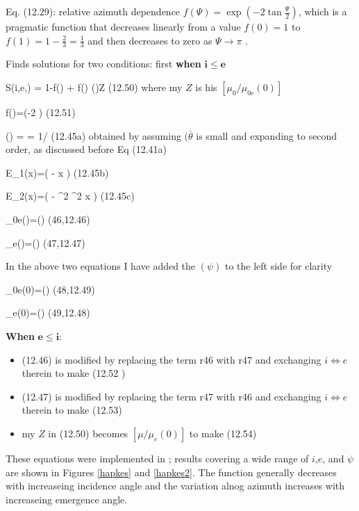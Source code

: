 \documentclass{article}
\begin{document}
 Eq. (12.29): relative azimuth dependence $f(\Psi)=\exp
  \left( -2 \tan \frac{\Psi}{2} \right)$, which is a pragmatic function that
  \bq decreases linearly from a value $f(0)=1$ to
  $f(1)=1-\frac{2}{3}=\frac{1}{3}$ and then decreases to zero as $\Psi
  \rightarrow \pi$ \eq.

  Finds solutions for two conditions: first \textbf{when} $\mathbf{i \leq e}$

 \qb S(i,e,\psi) =   
\frac{\chi(\overline{\theta})} {1-f(\psi) + f(\psi) \chi(\overline{\theta})Z} \qeq (12.50) \qe
 where my $Z$ is his $[ \mu_0 / \mu_{0e}(0)] $

\qb f(\psi)=\exp (-2 \tan {}) \qeq (12.51) \qe

\qb \chi(\overline{\theta}) = \langle \cos \vartheta \rangle = 1/ \qeq (12.45a) \qe obtained by assuming $(\overline{\theta}$ is small and expanding to second order, as discussed before Eq (12.41a)

\qb E_1(x)=\exp \left( - \cot  \overline{\theta} \cot x \right) \qeq (12.45b) \qe

\qb E_2(x)=\exp \left( - \cot^2  \overline{\theta} \cot^2 x \right) \qeq (12.45c) \qe

\qb \mu_{0e}(\psi)=\chi(\overline{\theta})    \qeq (46,12.46) \qe

\qb \mu_e(\psi)=\chi(\overline{\theta})    \qeq (47,12.47) \qe

In the above two equations I have added the $(\psi)$ to the left side for clarity

\qb \mu_{0e}(0)=\chi(\overline{\theta})    \qeq (48,12.49) \qe

\qb \mu_e(0)=\chi(\overline{\theta})    \qeq (49,12.48) \qe

 \textbf{When} $\mathbf{ e \leq i}$:
 
\begin{itemize}      %
\item 
 (12.46) is modified by replacing the term r46 with r47 and exchanging $i \Leftrightarrow e$ therein to make  (12.52 )
\item    (12.47) is modified by replacing the term r47 with r46 and exchanging $i \Leftrightarrow e$ therein to make  (12.53)    
\item my $Z$ in (12.50) becomes $[ \mu / \mu_e(0)] $ to make (12.54)

\end{itemize}
These equations were implemented in ; results covering a wide
range of $i$,$e$, and $\psi$ are shown in Figures \ref{hapkes} and
\ref{hapkes2}. The function generally decreases with increaseing incidence angle
and the variation alnog azimuth increases with increaseing emergence angle.
\end{document}
